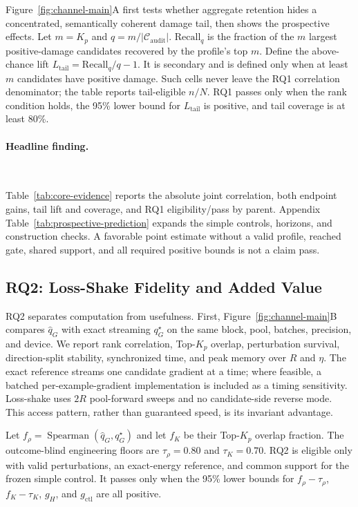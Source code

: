 Figure~\ref{fig:channel-main}A first tests whether aggregate retention hides a
concentrated, semantically coherent damage tail, then shows the prospective
effects. Let $m=K_p$ and $q=m/|\mathcal C_{\mathrm{audit}}|$.
$\mathrm{Recall}_q$ is the fraction of the $m$ largest positive-damage
candidates recovered by the profile's top $m$. Define the above-chance lift
$L_{\mathrm{tail}}=\mathrm{Recall}_q/q-1$. It is
secondary and is defined only when at least $m$ candidates have positive
damage. Such cells never leave the RQ1 correlation denominator; the table
reports tail-eligible $n/N$. RQ1 passes only when the rank condition holds,
the 95\% lower bound for $L_{\mathrm{tail}}$ is positive, and tail coverage is
at least 80\%.

\paragraph{Headline finding.}
{\setlength{\emergencystretch}{3em}
\TailHeadline\ \PredictionHeadline\par}

Table~\ref{tab:core-evidence} reports the absolute joint correlation, both
endpoint gains, tail lift and coverage, and RQ1 eligibility/pass by parent.
Appendix Table~\ref{tab:prospective-prediction} expands the simple controls,
horizons, and construction checks. A favorable point estimate without a valid
profile, reached gate, shared support, and all required positive bounds is not
a claim pass.

\subsection{RQ2: Loss-Shake Fidelity and Added Value}
\label{sec:exp-fidelity}

RQ2 separates computation from usefulness. First,
Figure~\ref{fig:channel-main}B compares $\widehat q_G$ with exact streaming
$q_G^\star$ on the same block, pool, batches, precision, and device. We report
rank correlation, Top-$K_p$ overlap, perturbation survival, direction-split
stability, synchronized time, and peak memory over $R$ and $\eta$. The exact
reference streams one candidate gradient at a time; where feasible, a batched
per-example-gradient implementation is included as a timing sensitivity.
Loss-shake uses $2R$ pool-forward sweeps and no candidate-side reverse mode.
This access pattern, rather than guaranteed speed, is its invariant advantage.

Let $f_\rho=\operatorname{Spearman}(\widehat q_G,q_G^\star)$ and let $f_K$ be
their Top-$K_p$ overlap fraction. The outcome-blind engineering floors are
$\tau_\rho=0.80$ and $\tau_K=0.70$. RQ2 is eligible only with valid
perturbations, an exact-energy reference, and common support for the frozen
simple control. It passes only when the 95\% lower bounds for
$f_\rho-\tau_\rho$, $f_K-\tau_K$, $g_H$, and $g_{\mathrm{ctl}}$ are all
positive.

